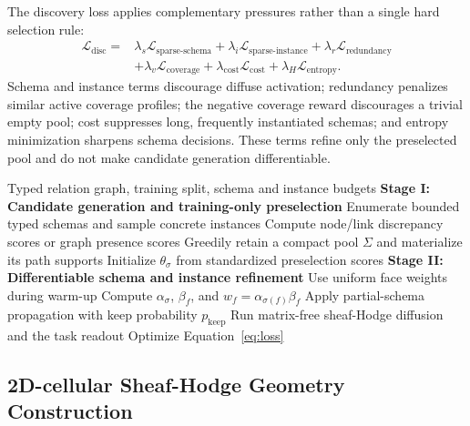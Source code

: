 \documentclass[sigconf,anonymous,review]{acmart}
\newcommand{\ampss}{\textsc{AMPSS}}
\newcommand{\cL}{\mathcal{L}}
\begin{document}
The discovery loss applies complementary pressures rather than a single hard selection rule:
\begin{equation}
  \begin{aligned}
  \cL_{\mathrm{disc}}={}&
  \lambda_s\cL_{\mathrm{sparse\text{-}schema}}
  +\lambda_i\cL_{\mathrm{sparse\text{-}instance}}
  +\lambda_r\cL_{\mathrm{redundancy}}\\
  &+\lambda_v\cL_{\mathrm{coverage}}
  +\lambda_{\mathrm{cost}}\cL_{\mathrm{cost}}
  +\lambda_H\cL_{\mathrm{entropy}} .
  \end{aligned}
  \label{eq:discovery-loss}
\end{equation}
Schema and instance terms discourage diffuse activation; redundancy penalizes similar active
coverage profiles; the negative coverage reward discourages a trivial empty pool; cost suppresses
long, frequently instantiated schemas; and entropy minimization sharpens schema decisions.  These
terms refine only the preselected pool and do not make candidate generation differentiable.

\begin{algorithm}[t]
  \caption{\ampss{} candidate preselection and differentiable refinement}
  \label{alg:ampss}
  \begin{algorithmic}[1]
    \REQUIRE Typed relation graph, training split, schema and instance budgets
    \STATE \textbf{Stage I: Candidate generation and training-only preselection}
    \STATE Enumerate bounded typed schemas and sample concrete instances
    \STATE Compute node/link discrepancy scores or graph presence scores
    \STATE Greedily retain a compact pool \(\Sigma\) and materialize its path supports
    \STATE Initialize \(\theta_\sigma\) from standardized preselection scores
      \STATE \textbf{Stage II: Differentiable schema and instance refinement}
      \STATE Use uniform face weights during warm-up
      \STATE Compute \(\alpha_\sigma\), \(\beta_f\), and \(w_f=\alpha_{\sigma(f)}\beta_f\)
      \STATE Apply partial-schema propagation with keep probability \(p_{\mathrm{keep}}\)
      \STATE Run matrix-free sheaf-Hodge diffusion and the task readout
      \STATE Optimize Equation~\ref{eq:loss}
    \ENDFOR
  \end{algorithmic}
\end{algorithm}

\subsection{2D-cellular Sheaf-Hodge Geometry Construction}
\end{document}
